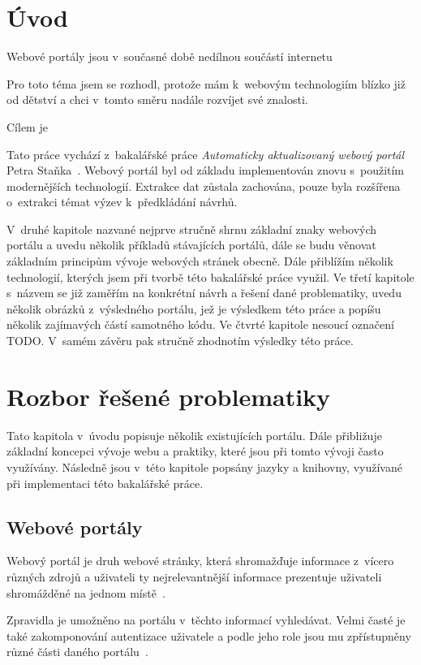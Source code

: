 \chapter{Úvod}
Webové portály jsou v~současné době nedílnou součástí internetu \blindtext

Pro toto téma jsem se rozhodl, protože mám k~webovým technologiím blízko již od dětství a chci v~tomto směru nadále rozvíjet své znalosti.

Cílem je \blindtext

Tato práce vychází z~bakalářské práce \emph{Automaticky aktualizovaný webový portál} Petra Staňka~\cite{bib:stanek}.
Webový portál byl od základu implementován znovu s~použitím modernějších technologií. Extrakce dat zůstala zachována, pouze byla rozšířena o~extrakci témat výzev k~předkládání návrhů.

V~druhé kapitole nazvané  nejprve stručně shrnu základní znaky webových portálu a uvedu několik příkladů stávajících portálů, dále se budu věnovat základním principům vývoje webových stránek obecně. Dále přiblížím několik technologií, kterých jsem při tvorbě této bakalářské práce využil.
Ve třetí kapitole s~názvem  se již zaměřím na konkrétní návrh a řešení dané problematiky, uvedu několik obrázků z~výsledného portálu, jež je výsledkem této práce a popíšu několik zajímavých částí samotného kódu.
Ve čtvrté kapitole nesoucí označení  TODO. V~samém závěru pak stručně zhodnotím výsledky této práce.




\chapter{Rozbor řešené problematiky}
Tato kapitola v~úvodu popisuje několik existujících portálu. Dále přibližuje základní koncepci vývoje webu a praktiky, které jsou při tomto vývoji často využívány. Následně jsou v~této kapitole popsány jazyky a knihovny, využívané při implementaci této bakalářské práce.

\section{Webové portály}
Webový portál je druh webové stránky, která shromažďuje informace z~vícero různých zdrojů a uživateli ty nejrelevantnější informace prezentuje uživateli shromážděné na jednom místě~\cite{bib:portal-liferay}.

Zpravidla je umožněno na portálu v~těchto informací vyhledávat. Velmi časté je také zakomponování autentizace uživatele a podle jeho role jsou mu zpřístupněny různé části daného portálu~\cite{bib:portal-indiana}.

